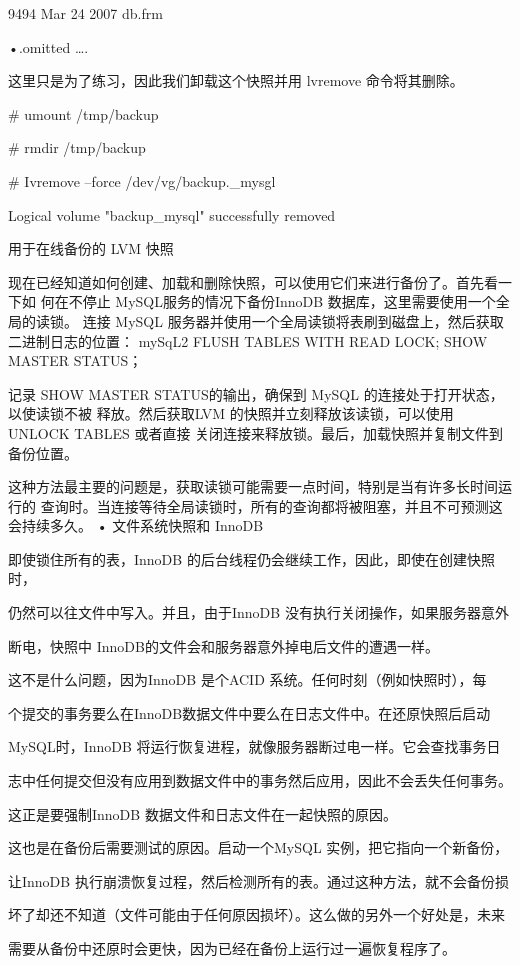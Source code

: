 9494 Mar 24 2007 db.frm

•.omitted ….

这里只是为了练习，因此我们卸载这个快照并用 lvremove 命令将其删除。

# umount /tmp/backup

# rmdir /tmp/backup

# Ivremove --force /dev/vg/backup.\_mysgl

Logical volume "backup\_mysql" successfully removed

用于在线备份的 LVM 快照

现在已经知道如何创建、加载和删除快照，可以使用它们来进行备份了。首先看一下如
何在不停止 MySQL服务的情况下备份InnoDB 数据库，这里需要使用一个全局的读锁。
连接 MySQL 服务器并使用一个全局读锁将表刷到磁盘上，然后获取二进制日志的位置：
mySqL2 FLUSH TABLES WITH READ LOCK; SHOW MASTER STATUS；

记录 SHOW MASTER STATUS的输出，确保到 MySQL 的连接处于打开状态，以使读锁不被
释放。然后获取LVM 的快照并立刻释放该读锁，可以使用 UNLOCK TABLES 或者直接
关闭连接来释放锁。最后，加载快照并复制文件到备份位置。

这种方法最主要的问题是，获取读锁可能需要一点时间，特别是当有许多长时间运行的
查询时。当连接等待全局读锁时，所有的查询都将被阻塞，并且不可预测这会持续多久。
• 文件系统快照和 InnoDB

即使锁住所有的表，InnoDB 的后台线程仍会继续工作，因此，即使在创建快照时，

仍然可以往文件中写入。并且，由于InnoDB 没有执行关闭操作，如果服务器意外

断电，快照中 InnoDB的文件会和服务器意外掉电后文件的遭遇一样。

这不是什么问题，因为InnoDB 是个ACID 系统。任何时刻（例如快照时），每

个提交的事务要么在InnoDB数据文件中要么在日志文件中。在还原快照后启动

MySQL时，InnoDB 将运行恢复进程，就像服务器断过电一样。它会查找事务日

志中任何提交但没有应用到数据文件中的事务然后应用，因此不会丢失任何事务。

这正是要强制InnoDB 数据文件和日志文件在一起快照的原因。

这也是在备份后需要测试的原因。启动一个MySQL 实例，把它指向一个新备份，

让InnoDB 执行崩溃恢复过程，然后检测所有的表。通过这种方法，就不会备份损

坏了却还不知道（文件可能由于任何原因损坏）。这么做的另外一个好处是，未来

需要从备份中还原时会更快，因为已经在备份上运行过一遍恢复程序了。

